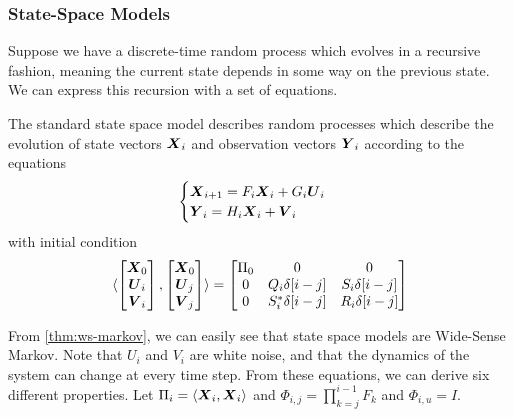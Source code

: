 \subsubsection{State-Space Models}
Suppose we have a discrete-time random process which evolves in a recursive fashion, meaning the current state depends in some way on the previous state.
We can express this recursion with a set of equations.
\begin{definition}
	The standard state space model describes random processes which describe the evolution of state vectors $\boldsymbol{X}_i$ and observation vectors $\boldsymbol{Y}_i$ according to the equations
	\[
		\begin{cases}
			\boldsymbol{X}_{i+1} = F_i \boldsymbol{X}_i + G_i \boldsymbol{U}_i\\
			\boldsymbol{Y}_{i} = H_i\boldsymbol{X}_i + \boldsymbol{V}_i
		\end{cases}
	\]
	with initial condition
	\[
		\langle \begin{bmatrix}\boldsymbol{X}_0 \\ \boldsymbol{U}_i \\ \boldsymbol{V}_i\end{bmatrix}, \begin{bmatrix}\boldsymbol{X}_0 \\ \boldsymbol{U}_j \\ \boldsymbol{V}_j\end{bmatrix} \rangle = \begin{bmatrix}
			\Pi_0 & 0 & 0\\
			0 & Q_i\delta[i-j] & S_i\delta[i-j]\\
			0 & S_i^*\delta[i-j] & R_i\delta[i-j]
		\end{bmatrix}
	\]
	\label{defn:state-space-model}
\end{definition}
From \cref{thm:ws-markov}, we can easily see that state space models are Wide-Sense Markov.
Note that $U_i$ and $V_i$ are white noise, and that the dynamics of the system can change at every time step.
From these equations, we can derive six different properties.
Let $\Pi_i = \langle \boldsymbol{X}_i, \boldsymbol{X}_i \rangle$ and $\Phi_{i,j} = \prod_{k=j}^{i-1}F_k$ and $\Phi_{i,u} = I$.
